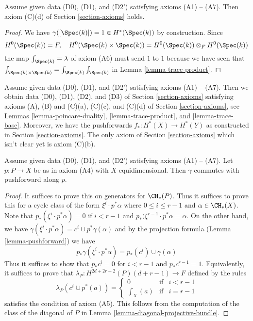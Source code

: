 \begin{lemma}
\label{lemma-trace-base}
Assume given data (D0), (D1), and (D2') satisfying axioms (A1) -- (A7).
Then axiom (C)(d) of Section \ref{section-axioms} holds.
\end{lemma}

\begin{proof}
We have $\gamma([\Spec(k)]) = 1 \in H^*(\Spec(k))$ by construction.
Since
$$
H^0(\Spec(k)) = F,\quad
H^0(\Spec(k) \times \Spec(k)) = H^0(\Spec(k)) \otimes_F H^0(\Spec(k))
$$
the map $\int_{\Spec(k)} = \lambda$ of axiom (A6) must send $1$ to $1$
because we have seen that
$\int_{\Spec(k) \times \Spec(k)} = \int_{\Spec(k)} \int_{\Spec(k)}$
in Lemma \ref{lemma-trace-product}.
\end{proof}

\noindent
Assume given data (D0), (D1), and (D2') satisfying axioms (A1) -- (A7).
Then we obtain data (D0), (D1), (D2), and (D3) of
Section \ref{section-axioms}
satisfying axioms (A), (B) and (C)(a), (C)(c), and (C)(d)
of Section \ref{section-axioms}, see
Lemmas \ref{lemma-poincare-duality}, \ref{lemma-trace-product}, and
\ref{lemma-trace-base}.
Moreover, we have the pushforwards $f_* : H^*(X) \to H^*(Y)$
as constructed in Section \ref{section-axioms}. The only axiom of
Section \ref{section-axioms}
which isn't clear yet is axiom (C)(b).

\begin{lemma}
\label{lemma-ok-for-projective-bundle}
Assume given data (D0), (D1), and (D2') satisfying axioms (A1) -- (A7).
Let $p : P \to X$ be as in axiom (A4) with $X$ equidimensional.
Then $\gamma$ commutes with pushforward along $p$.
\end{lemma}

\begin{proof}
It suffices to prove this on generators for $\CH_*(P)$.
Thus it suffices to prove this for a cycle class of the
form $\xi^i \cdot p^*\alpha$ where $0 \leq i \leq r - 1$
and $\alpha \in \CH_*(X)$. Note that $p_*(\xi^i \cdot p^*\alpha) = 0$
if $i < r - 1$ and $p_*(\xi^{r - 1} \cdot p^*\alpha = \alpha$.
On the other hand, we have
$\gamma(\xi^i \cdot p^*\alpha) = c^i \cup p^*\gamma(\alpha)$
and by the projection formula (Lemma \ref{lemma-pushforward})
we have
$$
p_*\gamma(\xi^i \cdot p^*\alpha) = p_*(c^i) \cup \gamma(\alpha)
$$
Thus it suffices to show that $p_*c^i = 0$ for $i < r - 1$ and
$p_*c^{r - 1} = 1$. Equivalently, it suffices to prove that
$\lambda_P : H^{2d + 2r - 2}(P)(d + r - 1) \to F$ defined by
the rules
$$
\lambda_P(c^i \cup p^*(a)) =
\left\{
\begin{matrix}
0 & \text{if} & i < r - 1 \\
\int_X(a) & \text{if} & i = r - 1
\end{matrix}
\right.
$$
satisfies the condition of axiom (A5). This follows from the
computation of the class of the diagonal of $P$ in
Lemma \ref{lemma-diagonal-projective-bundle}.
\end{proof}


